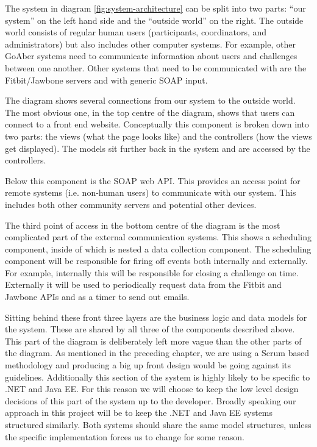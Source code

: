 The system in diagram \ref{fig:system-architecture} can be split into two parts: ``our system'' on the left hand side and the ``outside world'' on the right. The outside world consists of regular human users (participants, coordinators, and administrators) but also includes other computer systems. For example, other GoAber systems need to communicate information about users and challenges between one another. Other systems that need to be communicated with are the Fitbit/Jawbone servers and with generic SOAP input.

The diagram shows several connections from our system to the outside world. The most obvious one, in the top centre of the diagram, shows that users can connect to a front end website. Conceptually this component is broken down into two parts: the views (what the page looks like) and the controllers (how the views get displayed). The models sit further back in the system and are accessed by the controllers.

Below this component is the SOAP web API. This provides an access point for remote systems (i.e. non-human users) to communicate with our system. This includes both other community servers and potential other devices.

The third point of access in the bottom centre of the diagram is the most complicated part of the external communication systems. This shows a scheduling component, inside of which is nested a data collection component. The scheduling component will be responsible for firing off events both internally and externally. For example, internally this will be responsible for closing a challenge on time. Externally it will be used to periodically request data from the Fitbit and Jawbone APIs and as a timer to send out emails.

Sitting behind these front three layers are the business logic and data models for the system. These are shared by all three of the components described above. This part of the diagram is deliberately left more vague than the other parts of the diagram. As mentioned in the preceding chapter, we are using a Scrum based methodology and producing a big up front design would be going against its guidelines. Additionally this section of the system is highly likely to be specific to .NET and Java EE. For this reason we will choose to keep the low level design decisions of this part of the system up to the developer. Broadly speaking our approach in this project will be to keep the .NET and Java EE systems structured similarly. Both systems should share the same model structures, unless the specific implementation forces us to change for some reason.

